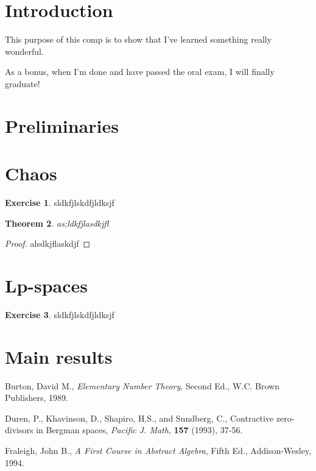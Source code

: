 \documentclass[11pt]{article}
\theoremstyle{plain}
\newtheorem{theorem}{Theorem}[section]
\theoremstyle{definition}
\newtheorem{exer}[theorem]{Exercise}
\begin{document}
\newpage
\doublespacing
\setcounter{page}{1}
\section{Introduction}

This purpose of this comp is to show that I've learned something really wonderful.

As a bonus, when I'm done and have passed the oral exam, I will finally graduate!


\newpage
\section{Preliminaries}


\newpage
\section{Chaos}


\begin{exer}
sldkfjlskdfjldksjf
\end{exer}




\begin{theorem}
as;ldkfjlasdkjfl
\end{theorem}

\begin{proof}
alsdkjflaskdjf
\end{proof}

\newpage
\section{Lp-spaces}
\begin{exer}
sldkfjlskdfjldksjf
\end{exer}

\newpage
\section{Main results}



\newpage  
\begin{thebibliography}{99}
\singlespacing
{} Burton, David M., \emph{Elementary Number Theory}, Second Ed., W.C. Brown Publishers, 1989.

 Duren, P., Khavinson, D., Shapiro, H.S., and Sundberg, C., Contractive zero-divisors in Bergman spaces, \textit{Pacific J. Math}, \textbf{157} (1993), 37-56.

  Fraleigh, John B., \emph{A First Course in Abstract Algebra}, Fifth Ed., Addison-Wesley, 1994. 

\end{thebibliography}

\end{document}

